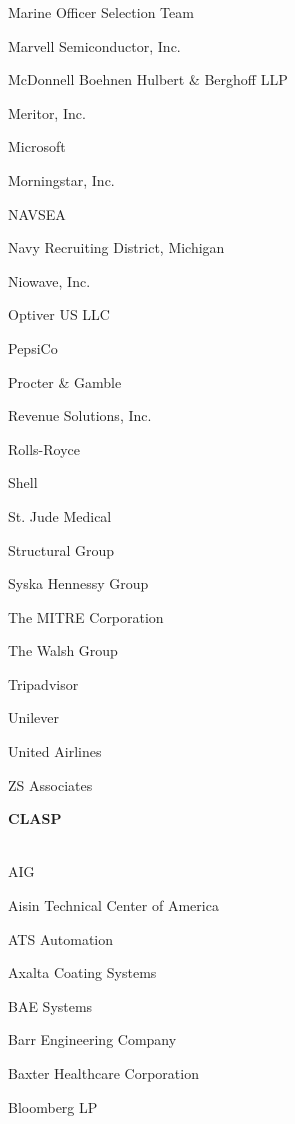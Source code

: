 \documentclass[twoside]{article}
\begin{document}
\begin{center}
\begin{multicols}{5}
\begin{FlushLeft}
\begin{compactitem}
\item Marine Officer Selection Team
\item Marvell Semiconductor, Inc.
\item McDonnell Boehnen Hulbert \& Berghoff LLP
\item Meritor, Inc.
\item Microsoft
\item Morningstar, Inc.
\item NAVSEA
\item Navy Recruiting District, Michigan
\item Niowave, Inc.
\item Optiver US LLC
\item PepsiCo
\item Procter \& Gamble
\item Revenue Solutions, Inc.
\item Rolls-Royce
\item Shell
\item St. Jude Medical
\item Structural Group
\item Syska Hennessy Group
\item The MITRE Corporation
\item The Walsh Group
\item Tripadvisor
\item Unilever
\item United Airlines
\item ZS Associates
\end{compactitem}
        \end{FlushLeft}
        \vspace{1em}
        {\fontsize{14}{16}\selectfont \bf CLASP}\\
        \vspace{-1em}
        ~\hrulefill~
        \vspace{-.9em}
        \begin{FlushLeft}
        \begin{compactitem}
        \item AIG
\item Aisin Technical Center of America
\item ATS Automation
\item Axalta Coating Systems
\item BAE Systems
\item Barr Engineering Company
\item Baxter Healthcare Corporation
\item Bloomberg LP

\end{compactitem}
\end{FlushLeft}
\end{multicols}
\end{center}
\end{document}

